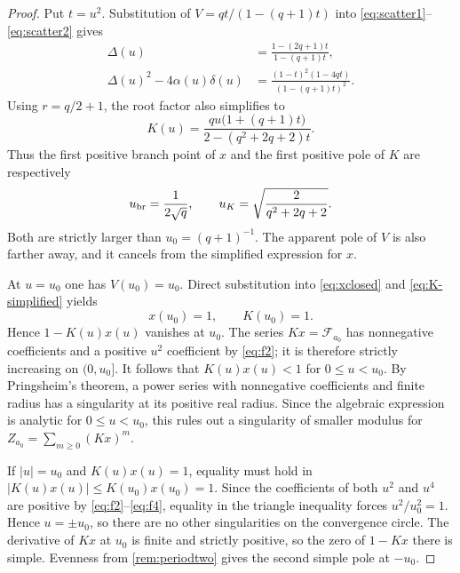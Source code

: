 \documentclass[11pt,reqno]{amsart}
\numberwithin{equation}{section}
\theoremstyle{definition}
\theoremstyle{remark}
\newcommand{\cF}{\mathcal F}
\begin{document}
\begin{proof}
Put $t=u^2$.  Substitution of
$V=qt/(1-(q+1)t)$ into \eqref{eq:scatter1}--\eqref{eq:scatter2} gives
\begin{align}
 \Delta(u)&=\frac{1-(2q+1)t}{1-(q+1)t},
 \label{eq:Delta-simplified}\\
 \Delta(u)^2-4\alpha(u)\delta(u)
 &=\frac{(1-t)^2(1-4qt)}{(1-(q+1)t)^2}.
 \label{eq:discriminant-factorization}
\end{align}
Using $r=q/2+1$, the root factor also simplifies to
\begin{equation}\label{eq:K-simplified}
 K(u)=\frac{qu\bigl(1+(q+1)t\bigr)}
 {2-(q^2+2q+2)t}.
\end{equation}
Thus the first positive branch point of $x$ and the first positive pole of
$K$ are respectively
\[
 u_{\rm br}=\frac1{2\sqrt q},
 \qquad
 u_K=\sqrt{\frac2{q^2+2q+2}}.
\]
Both are strictly larger than $u_0=(q+1)^{-1}$.  The apparent pole of $V$ is
also farther away, and it cancels from the simplified expression for $x$.

At $u=u_0$ one has $V(u_0)=u_0$.  Direct substitution into
\eqref{eq:xclosed} and \eqref{eq:K-simplified} yields
\begin{equation}\label{eq:critical-Kx}
 x(u_0)=1,
 \qquad K(u_0)=1.
\end{equation}
Hence $1-K(u)x(u)$ vanishes at $u_0$.  The series $Kx=\cF_{a_0}$ has
nonnegative coefficients and a positive $u^2$ coefficient by \eqref{eq:f2};
it is therefore strictly increasing on $(0,u_0]$.  It follows that
$K(u)x(u)<1$ for $0\le u<u_0$.  By Pringsheim's theorem, a power series with
nonnegative coefficients and finite radius has a singularity at its positive
real radius.  Since the algebraic expression is analytic for $0\le u<u_0$,
this rules out a singularity of smaller modulus for
$Z_{a_0}=\sum_{m\ge0}(Kx)^m$.

If $|u|=u_0$ and $K(u)x(u)=1$, equality must hold in
$|K(u)x(u)|\le K(u_0)x(u_0)=1$.  Since the coefficients of both $u^2$ and
$u^4$ are positive by \eqref{eq:f2}--\eqref{eq:f4}, equality in the triangle
inequality forces $u^2/u_0^2=1$.  Hence $u=\pm u_0$, so there are no other
singularities on the convergence circle.  The derivative of $Kx$ at $u_0$ is
finite and strictly positive, so the zero of $1-Kx$ there is simple.  Evenness
from \cref{rem:periodtwo} gives the second simple pole at $-u_0$.
\end{proof}
\end{document}
